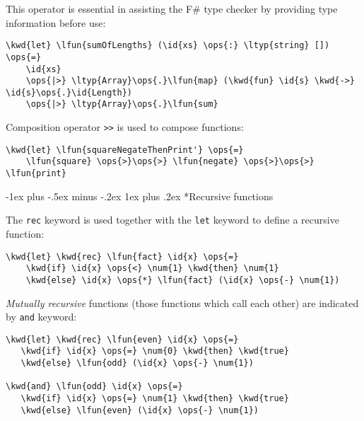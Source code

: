 \documentclass[10pt,landscape]{article}
\makeatletter
\renewcommand{\subsubsection}{\@startsection{subsubsection}{3}{0mm}%
                                {-1ex plus -.5ex minus -.2ex}%
                                {1ex plus .2ex}%
                                {\normalfont\small\bfseries}}
\newcommand{\id}[1]{\textcolor[HTML]{000000}{#1}}
\newcommand{\kwd}[1]{\textcolor[HTML]{0000FF}{#1}}
\newcommand{\ops}[1]{\textcolor[HTML]{000000}{#1}}
\newcommand{\num}[1]{\textcolor[HTML]{000000}{#1}}
\newcommand{\ltyp}[1]{\textcolor[HTML]{2B91AF}{#1}}
\newcommand{\lfun}[1]{\textcolor[HTML]{AA5500}{#1}}
\makeatother
\begin{document}
\begin{multicols}{3}
\begin{Verbatim}[commandchars=\\\{\}]
\end{Verbatim}



This operator is essential in assisting the F\# type checker by providing type information before use:
\begin{Verbatim}[commandchars=\\\{\}]
\kwd{let} \lfun{sumOfLengths} (\id{xs} \ops{:} \ltyp{string} []) \ops{=} 
    \id{xs} 
    \ops{|>} \ltyp{Array}\ops{.}\lfun{map} (\kwd{fun} \id{s} \kwd{->} \id{s}\ops{.}\id{Length})
    \ops{|>} \ltyp{Array}\ops{.}\lfun{sum}

\end{Verbatim}



Composition operator \texttt{>>} is used to compose functions:
\begin{Verbatim}[commandchars=\\\{\}]
\kwd{let} \lfun{squareNegateThenPrint'} \ops{=} 
    \lfun{square} \ops{>}\ops{>} \lfun{negate} \ops{>}\ops{>} \lfun{print}

\end{Verbatim}

\subsubsection*{Recursive functions}



The \texttt{rec} keyword is used together with the \texttt{let} keyword to define a recursive function:
\begin{Verbatim}[commandchars=\\\{\}]
\kwd{let} \kwd{rec} \lfun{fact} \id{x} \ops{=}
    \kwd{if} \id{x} \ops{<} \num{1} \kwd{then} \num{1}
    \kwd{else} \id{x} \ops{*} \lfun{fact} (\id{x} \ops{-} \num{1})

\end{Verbatim}



\emph{Mutually recursive} functions (those functions which call each other) are indicated by \texttt{and} keyword:
\begin{Verbatim}[commandchars=\\\{\}]
\kwd{let} \kwd{rec} \lfun{even} \id{x} \ops{=}
   \kwd{if} \id{x} \ops{=} \num{0} \kwd{then} \kwd{true} 
   \kwd{else} \lfun{odd} (\id{x} \ops{-} \num{1})

\kwd{and} \lfun{odd} \id{x} \ops{=}
   \kwd{if} \id{x} \ops{=} \num{1} \kwd{then} \kwd{true} 
   \kwd{else} \lfun{even} (\id{x} \ops{-} \num{1})


\end{Verbatim}
\end{multicols}
\end{document}
